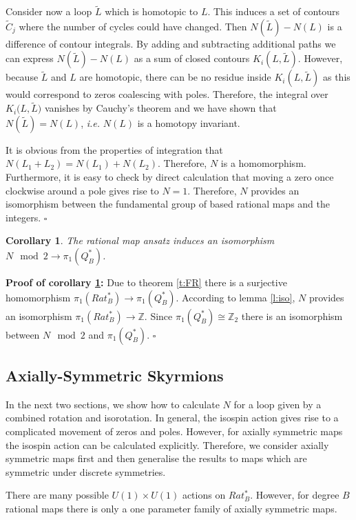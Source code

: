 \documentclass[a4paper,12pt]{article}
\newtheorem {corollary}[theorem]{Corollary}
\begin{document}
Consider now a loop ${\tilde L}$ which is homotopic to $L$. This induces a
set of contours ${\tilde C}_j$ where the number of cycles could have changed. 
Then $N({\tilde L}) - N(L)$ is a difference of contour integrals.
By adding and subtracting additional paths we can express 
$N({\tilde L}) - N(L)$ as a sum of closed contours $K_i(L,{\tilde L})$. 
However, 
because ${\tilde L}$  and $L$ are homotopic, there can be no residue inside 
$K_i(L,{\tilde L})$ as this would correspond to zeros coalescing with poles. 
Therefore, the integral over $K_i(L,{\tilde L)}$ vanishes by Cauchy's theorem 
and we have shown that $N({\tilde L}) = N(L)$, {\it i.e.} $N(L)$ is a homotopy 
invariant.

It is obvious from the properties of integration that $N(L_1 + L_2) = N(L_1) + 
N(L_2)$. Therefore, $N$ is a homomorphism. Furthermore, it is easy to check by 
direct calculation that moving a zero once clockwise around a pole gives 
rise to $N=1$. 
Therefore, $N$ provides an isomorphism between the fundamental 
group of based rational maps and the integers. \hfill $\square$ 


\begin{corollary}
\label{c:N}
The rational map ansatz induces an isomorphism $N \mod 2 \to \pi_1(Q_B^*)$.
\end{corollary}
%
{\bf Proof of corollary \ref{c:N}:}
Due to theorem \ref{t:FR} there is a surjective homomorphism 
$\pi_1(Rat_B^*) \to \pi_1(Q_B^*)$. According to lemma \ref{l:iso}, $N$ 
provides an isomorphism $\pi_1(Rat_B^*) \to {\mathbb Z}$. Since 
$\pi_1(Q_B^*) \cong {\mathbb Z}_2$ there is an isomorphism between 
$N \mod 2$ and $\pi_1(Q_B^*)$. \hfill $\square$\\   


\subsection{Axially-Symmetric Skyrmions}
\label{Axial}

In the next two sections, we show how to calculate $N$ for a loop given by 
a combined 
rotation and isorotation. In general, the isospin action gives rise to a 
complicated movement of zeros and poles. However, for axially symmetric 
maps the isospin action can be calculated explicitly. 
Therefore, we consider axially symmetric maps first and then  
generalise the results to maps which are symmetric under discrete symmetries.

There are many possible $U(1) \times U(1)$ actions on $Rat_B^*$. However, for 
degree $B$ rational maps there is only a one parameter family of axially 
symmetric maps.
\end{document}
